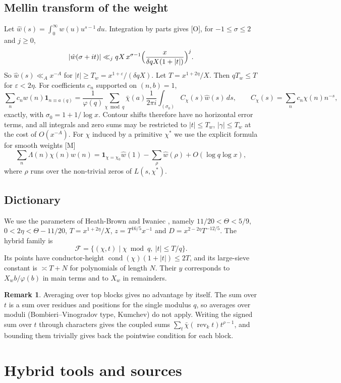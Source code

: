 \documentclass[11pt]{amsart}
\theoremstyle{definition}
\newtheorem{remark}[theorem]{Remark}
\numberwithin{equation}{section}
\newcommand{\cF}{\mathcal{F}}
\newcommand{\rev}{\operatorname{rev}}
\newcommand{\cond}{\operatorname{cond}}
\begin{document}
\subsection{Mellin transform of the weight}
Let $\hat w(s)=\int_0^\infty w(u)u^{s-1}\,du$. Integration by parts gives [O], for $-1\le\sigma\le2$ and $j\ge0$,
\[
|\hat w(\sigma+it)|\ll_j qX\,x^{\sigma-1}\Bigl(\frac{x}{\delta qX(1+|t|)}\Bigr)^{j}.
\]
So $\hat w(s)\ll_A x^{-A}$ for $|t|\ge T_w=x^{1+\varepsilon}/(\delta qX)$. Let $T=x^{1+2\eta}/X$. Then $qT_w\le T$ for $\varepsilon<2\eta$. For coefficients $c_n$ supported on $(n,b)=1$,
\[
\sum_n c_nw(n)\mathbf 1_{n\equiv a\,(q)}=\frac1{\varphi(q)}\sum_{\chi\bmod q}\bar\chi(a)\frac1{2\pi i}\int_{(\sigma_0)}C_\chi(s)\hat w(s)\,ds,\qquad C_\chi(s)=\sum_nc_n\chi(n)n^{-s},
\]
exactly, with $\sigma_0=1+1/\log x$. Contour shifts therefore have no horizontal error terms, and all integrals and zero sums may be restricted to $|t|\le T_w$, $|\gamma|\le T_w$ at the cost of $O(x^{-A})$. For $\chi$ induced by a primitive $\chi^*$ we use the explicit formula for smooth weights [M]
\[
\sum_n\Lambda(n)\chi(n)w(n)=\mathbf 1_{\chi=\chi_0}\hat w(1)-\sum_\rho\hat w(\rho)+O(\log q\log x),
\]
where $\rho$ runs over the non-trivial zeros of $L(s,\chi^*)$.

\subsection{Dictionary}
We use the parameters of Heath-Brown and Iwaniec \cite[p.~51]{HBI}, namely $11/20<\Theta<5/9$, $0<2\eta<\Theta-11/20$, $T=x^{1+2\eta}/X$, $z=T^{16/5}x^{-1}$ and $D=x^{2-2\eta}T^{-12/5}$. The hybrid family is
\[
\cF=\{(\chi,t)\mid\chi\bmod q,\ |t|\le T/q\}.
\]
Its points have conductor-height $\cond(\chi)(1+|t|)\le2T$, and its large-sieve constant is $\asymp T+N$ for polynomials of length $N$. Their $y$ corresponds to $X_wb/\varphi(b)$ in main terms and to $X_w$ in remainders.

\begin{remark}\label{rem:average}
Averaging over top blocks gives no advantage by itself. The sum over $t$ is a sum over residues and positions for the single modulus $q$, so averages over moduli (Bombieri--Vinogradov type, Kumchev) do not apply. Writing the signed sum over $t$ through characters gives the coupled sums $\sum_t\bar\chi(\rev_kt)t^{\rho-1}$, and bounding them trivially gives back the pointwise condition for each block.
\end{remark}

\section{Hybrid tools and sources}\label{sec:tools}
\end{document}

